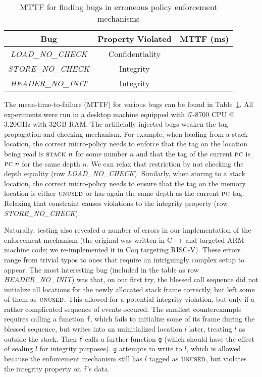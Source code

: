 \documentclass[acmsmall,review,anonymous]{acmart}\settopmatter{printfolios=true,printccs=false,printacmref=false}
\begin{document}
{\begin{table}[]
\centering
\begin{tabular}{c|c|c}
  Bug & Property Violated & MTTF (ms) \\
  \hline
      {\em LOAD\_NO\_CHECK}  & Confidentiality &  \\
      {\em STORE\_NO\_CHECK} & Integrity &  \\
      {\em HEADER\_NO\_INIT} & Integrity &  \\
\end{tabular}
\vspace*{1em}
\caption{MTTF for finding bugs in erroneous policy enforcement mechanisms}
\vspace*{-2em}
\label{tab:bug-table}
\end{table}

The mean-time-to-failure (MTTF) for various bugs can be found in
Table~\ref{tab:bug-table}. All experiments were run in a desktop
machine equipped with i7-8700 CPU @ 3.20GHz with 32GB
RAM.
%
The artificially injected bugs weaken the tag propagation
and checking mechanism.
%
For example, when loading from a stack location, the correct
micro-policy needs to enforce that the tag on the location being read
is $\textsc{stack} ~ n$ for some number $n$ and that the tag of the
current $\textsc{pc}$ is $\textsc{pc} ~ n$ for the same depth $n$. We can relax
that restriction by not checking the depth equality (row {\em
  LOAD\_NO\_CHECK}).
%
Similarly, when storing to a stack location, the correct micro-policy
needs to ensure that the tag on the memory location is either
$\textsc{unused}$ or has again the same depth as the current $\textsc{pc}$
tag. Relaxing that constraint causes violations to the integrity
property (row {\em STORE\_NO\_CHECK}).

Naturally, testing also revealed a number of errors in our
implementation of the enforcement mechanism (the original was written in C++
and targeted ARM machine code;
we re-implemented it in Coq targeting RISC-V).  These errors range
from trivial typos to ones that require an intriguingly complex setup
to appear.  The most interesting bug (included in the table as row
{\em HEADER\_NO\_INIT}) was that, on our first try, the blessed call
sequence %
did not initialize all locations for the
newly allocated stack frame correctly, but left some of them as
$\textsc{unused}$. This allowed for a potential integrity violation, but
only if a rather complicated sequence of events occured.
The smallest counterexample requires calling a function {\tt f},
which fails to initialize some of its frame during the blessed sequence,
but writes into an uninitialized location $l$ later, treating \(l\) as outside
the stack. Then {\tt f} calls a further function {\tt g} (which should have
the effect of sealing $l$ for integrity purposes). {\tt g} attempts to write to $l$,
which is allowed because the enforcement mechanism still has
$l$ tagged as $\textsc{unused}$, but violates the integrity property on {\tt f}'s data.


}
\end{document}
